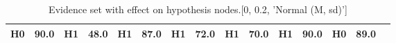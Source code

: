 \begin{table}
\begin{tabular}{c|cc|cc|cc|cc|cc|cc|cc}
\cellcolor{Bittersweet}H0&\cellcolor{Bittersweet}90.0&\cellcolor{Bittersweet}H1&\cellcolor{Bittersweet}48.0&\cellcolor{Bittersweet}H1&\cellcolor{Bittersweet}87.0&\cellcolor{Bittersweet}H1&\cellcolor{Bittersweet}72.0&\cellcolor{Bittersweet}H1&\cellcolor{Bittersweet}70.0&\cellcolor{Bittersweet}H1&\cellcolor{Bittersweet}90.0&\cellcolor{Bittersweet}H0&\cellcolor{Bittersweet}89.0\\\bottomrule\end{tabular}\caption{Evidence set with effect on hypothesis nodes.[0, 0.2, 'Normal (M, sd)']}\end{table}